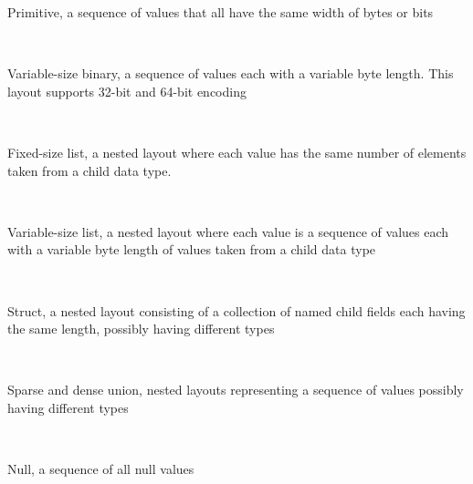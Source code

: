 \documentclass[10pt, a4paper]{report}
\begin{document}
\begin{itemize}
	\begin{minipage}{0.92\textwidth}
		\item Primitive, a sequence of values that all have the same width of bytes or bits \\
	\end{minipage} \\
	\begin{minipage}{0.92\textwidth}
		\item Variable-size binary, a sequence of values each with a variable byte length. This layout supports 32-bit and 64-bit encoding \\
	\end{minipage} \\
	\begin{minipage}{0.92\textwidth}
		\item Fixed-size list, a nested layout where each value has the same number of elements taken from a child data type. \\
	\end{minipage} \\
	\begin{minipage}{0.92\textwidth}
		\item Variable-size list, a nested layout where each value is a sequence of values each with a variable byte length of values taken from a child data type \\
	\end{minipage} \\
	\begin{minipage}{0.92\textwidth}
		\item Struct, a nested layout consisting of a collection of named child fields each having the same length, possibly having different types \\
	\end{minipage} \\
	\begin{minipage}{0.92\textwidth}
		\item Sparse and dense union, nested layouts representing a sequence of values possibly having different types \\
	\end{minipage} \\
	\begin{minipage}{0.92\textwidth}
		\item Null, a sequence of all null values \\
	\end{minipage}
\end{itemize}
\end{document}
